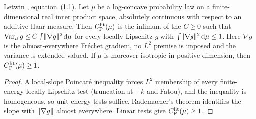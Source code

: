 \begin{lemma}
  \label{lem:letwin-ambient-poincare-constant}
  \leanok
  Letwin \cite{Letwin2026QuadraticKLS}, equation~(1.1). Let $\mu$ be a log-concave probability law on a
  finite-dimensional real inner product space, absolutely continuous with respect to an additive Haar measure. Then
  $C_{\mathrm P}^{\mathrm{lit}}(\mu)$ is the infimum of the $C\ge0$ such that $\operatorname{Var}_\mu g\le C\int\lVert\nabla g\rVert^2\,\mathrm d\mu$ for every locally
  Lipschitz $g$ with $\int\lVert\nabla g\rVert^2\,\mathrm d\mu\le1$. Here $\nabla g$ is the almost-everywhere Fr\'echet gradient, no
  $L^2$ premise is imposed and the variance is extended-valued. If $\mu$ is moreover isotropic in positive dimension,
  then $C_{\mathrm P}^{\mathrm{lit}}(\mu)\ge1$.
\end{lemma}
\begin{proof}
  \leanok
  A local-slope Poincar\'e inequality forces $L^2$ membership of every finite-energy locally Lipschitz test
  (truncation at $\pm k$ and Fatou), and the inequality is homogeneous, so unit-energy tests suffice. Rademacher's
  theorem identifies the slope with $\lVert\nabla g\rVert$ almost everywhere. Linear tests give $C_{\mathrm P}^{\mathrm{lit}}(\mu)\ge1$.
\end{proof}

